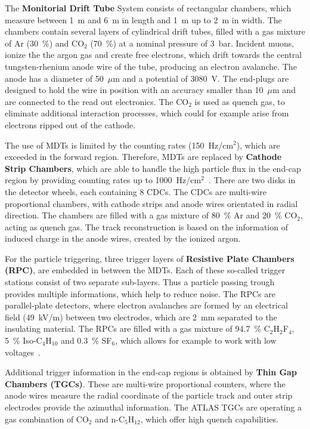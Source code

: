 The \textbf{Monitorial Drift Tube} System consists of rectangular  chambers, which measure between 1~m and 6~m in length and 1~m up to 2~m in width. The chambers contain several layers of cylindrical drift tubes, filled with a gas mixture of Ar (30~\%) and CO$_2$ (70~\%) at a nominal  pressure of 3~bar. Incident muons, ionize the the argon gas and create free electrons, which drift towards the central tungsten-rhenium anode wire of the tube, producing an electron avalanche.  The anode has a diameter of 50~$\mu$m and a potential of 3080~V. The end-plugs are designed to hold the wire in position with an accuracy smaller than 10~$\mu$m and are connected to the read out electronics. The CO$_2$ is used as quench gas, to eliminate additional interaction processes, which could for example arise from electrons ripped out of the cathode. 

 The use of MDTs is limited by the counting rates (150~Hz/cm$^2$), which are exceeded in the forward region. Therefore, MDTs are replaced by \textbf{Cathode Strip Chambers}, which are able to handle the high particle flux in the end-cap region by providing counting rates up to 1000~Hz/cm$^2$~\cite{ATLAS:1999uwa}. There are two disks in the detector wheels, each containing 8 CDCs. The CDCs are multi-wire proportional chambers, with cathode strips  and anode wires orientated in radial direction. The chambers are filled with a gas mixture of  80~\% Ar and 20~\% CO$_2$, acting as quench gas. The track reconstruction is based on the information of induced charge in the anode wires, created by the ionized argon.

 For the particle triggering, three trigger layers of \textbf{Resistive Plate Chambers (RPC)}, are embedded  in between the MDTs. Each of these so-called trigger stations consist of two separate sub-layers. Thus a particle passing trough provides multiple informations, which help to reduce noise.  The RPCs are parallel-plate detectors, where electron avalanches are formed by an electrical field (49~kV/m) between two electrodes, which are  2~mm separated to the insulating material. The RPCs are filled with a gas mixture of 94.7~\%   C$_2$H$_2$F$_4$, 5~\% Iso-C$_4$H$_{10}$ and 0.3~\% SF$_6$, which allows for example to work with  low voltages~\cite{ATLAS:1999uwa}. 

Additional trigger information in the end-cap regions is obtained by \textbf{Thin Gap Chambers (TGCs)}. These are multi-wire proportional counters, where the anode wires 
measure the radial coordinate of the particle track and outer strip electrodes provide the azimuthal information. The ATLAS TGCs are operating a gas combination of CO$_2$ and n-C$_5$H$_{12}$, which offer high quench capabilities.


